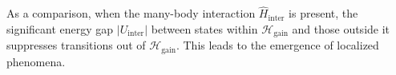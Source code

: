 \documentclass[longbibliography, aps, prx, amsmath, amssymb, amsfonts, twocolumn,superscriptaddress, footinbib]{revtex4-1}
\begin{document}
	As a comparison, when the many-body interaction $\hat{H}_{\text{inter}}$ is present, the significant energy gap $\vert U_{\text{inter}} \vert$ between states within $\mathscr{H}_{\text{gain}}$ and those outside it suppresses transitions out of $\mathscr{H}_{\text{gain}}$. This leads to the emergence of localized phenomena. 
\end{document}
